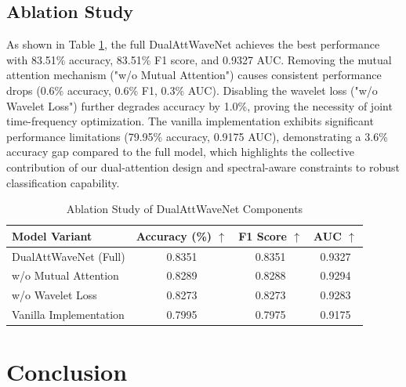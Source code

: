 \documentclass[conference]{IEEEtran}
\begin{document}
\subsection{Ablation Study}

As shown in Table \ref{tab:ablation}, the full DualAttWaveNet achieves the best performance with 83.51\% accuracy, 83.51\% F1 score, and 0.9327 AUC. Removing the mutual attention mechanism ("w/o Mutual Attention") causes consistent performance drops (0.6\% accuracy, 0.6\% F1, 0.3\% AUC). Disabling the wavelet loss ("w/o Wavelet Loss") further degrades accuracy by 1.0\%, proving the necessity of joint time-frequency optimization. The vanilla implementation exhibits significant performance limitations (79.95\% accuracy, 0.9175 AUC), demonstrating a 3.6\% accuracy gap compared to the full model, which highlights the collective contribution of our dual-attention design and spectral-aware constraints to robust classification capability.

\begin{table}[t]
    \caption{Ablation Study of DualAttWaveNet Components}
    \label{tab:ablation}
    \centering

    \begin{tabular}{lccc}
        \toprule
        \textbf{Model Variant} & \textbf{Accuracy (\%)} $\uparrow$ & \textbf{F1 Score} $\uparrow$ & \textbf{AUC} $\uparrow$ \\
        \midrule
        DualAttWaveNet (Full)  & 0.8351                            & 0.8351                       & 0.9327                  \\
        \cmidrule{1-4}
        w/o Mutual Attention   & 0.8289                            & 0.8288                       & 0.9294                  \\
        w/o Wavelet Loss       & 0.8273                            & 0.8273                       & 0.9283                  \\
        Vanilla Implementation & 0.7995                            & 0.7975                       & 0.9175                  \\
        \bottomrule
    \end{tabular}

\end{table}

\section{Conclusion}
\label{sec:conclusion}
\end{document}
